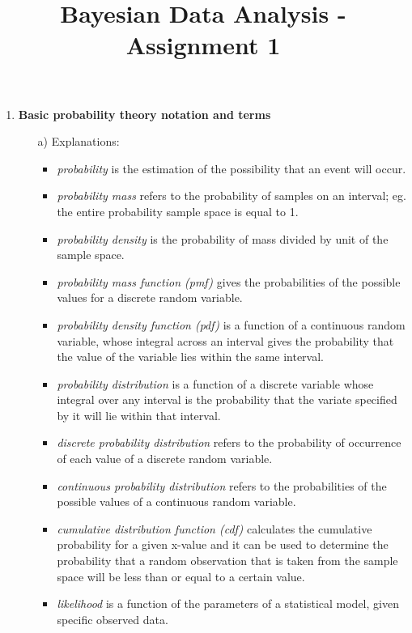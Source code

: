 \documentclass[11pt,a4paper,english]{article}
\title{Bayesian Data Analysis - Assignment 1}
\author{}
\begin{document}
    \maketitle

    \begin{enumerate}
      \item {\bf Basic probability theory notation and terms}
        \begin{itemize}
          \item[a)] Explanations:
            \begin{itemize}
              \item {\it probability}
                is the estimation of the possibility that an event will occur.
              \item {\it probability mass}
                refers to the probability of samples on an interval; eg. the entire probability
                sample space is equal to 1.
              \item {\it probability density}
                is the probability of mass divided by unit of the sample space.
              \item {\it probability mass function (pmf)}
                gives the probabilities of the possible values for a discrete random variable.
              \item {\it probability density function (pdf)}
                is a function of a continuous random variable, whose integral across an interval gives
                the probability that the value of the variable lies within the same interval.
              \item {\it probability distribution}
                is a function of a discrete variable whose integral over any interval is the probability
                that the variate specified by it will lie within that interval.
              \item {\it discrete probability distribution}
                refers to the probability of occurrence of each value of a discrete random variable.
              \item {\it continuous probability distribution}
                refers to the probabilities of the possible values of a continuous random variable.
              \item {\it cumulative distribution function (cdf)}
                calculates the cumulative probability for a given x-value and it can be used to determine
                the probability that a random observation that is taken from the sample space will be less
                than or equal to a certain value.
              \item {\it likelihood}
                is a function of the parameters of a statistical model, given specific observed data.
            \end{itemize}


\end{itemize}
\end{enumerate}
\end{document}
